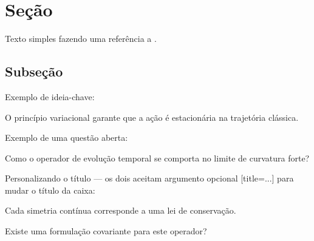 \section{Seção}
Texto simples fazendo uma referência a \cite{einstein1905}.

\subsection{Subseção}

Exemplo de ideia-chave:

  \begin{keyidea}
      O princípio variacional garante que a ação é estacionária
      na trajetória clássica.
  \end{keyidea}

Exemplo de uma questão aberta:
  \begin{openquestion}
      Como o operador de evolução temporal se comporta no limite
      de curvatura forte?
  \end{openquestion}

  Personalizando o título — os dois aceitam argumento opcional [title=...] para mudar o título da caixa:

  \begin{keyidea}[title=Teorema de Noether]
      Cada simetria contínua corresponde a uma lei de conservação.
  \end{keyidea}

  \begin{openquestion}[title=Problema em aberto \#3]
      Existe uma formulação covariante para este operador?
  \end{openquestion}

